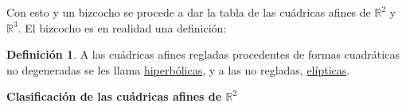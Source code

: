 \documentclass[12pt]{report}
\theoremstyle{definition}
\newtheorem{definition}{Definición}[chapter]
\theoremstyle{definition}
\theoremstyle{remark}
\newcommand{\R}{\mathbb R}
\begin{document}
Con esto y un bizcocho se procede a dar la tabla de las cuádricas afines de $\R^2$ y $\R^3$. El bizcocho es en realidad una definición:

\begin{definition}
A las cuádricas afines regladas procedentes de formas cuadráticas no degeneradas se les llama \ul{hiperbólicas}, y a las no regladas, \ul{elípticas}.
\end{definition}

\pagebreak

\thispagestyle{empty}

\begin{center} \textbf{Clasificación de las cuádricas afines de $\R^2$}

\vspace{6mm}

\footnotesize


\end{center}
\end{document}
